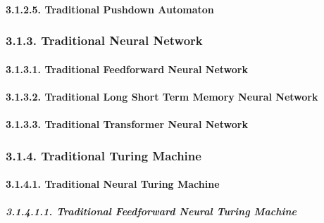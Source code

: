 \documentclass[
]{article}
\begin{document}
\hypertarget{traditional-pushdown-automaton-1}{%
\paragraph{3.1.2.5. Traditional Pushdown
Automaton}\label{traditional-pushdown-automaton-1}}

\hypertarget{traditional-neural-network-1}{%
\subsubsection{3.1.3. Traditional Neural
Network}\label{traditional-neural-network-1}}

\hypertarget{traditional-feedforward-neural-network-1}{%
\paragraph{3.1.3.1. Traditional Feedforward Neural
Network}\label{traditional-feedforward-neural-network-1}}

\hypertarget{traditional-long-short-term-memory-neural-network-1}{%
\paragraph{3.1.3.2. Traditional Long Short Term Memory Neural
Network}\label{traditional-long-short-term-memory-neural-network-1}}

\hypertarget{traditional-transformer-neural-network-1}{%
\paragraph{3.1.3.3. Traditional Transformer Neural
Network}\label{traditional-transformer-neural-network-1}}

\hypertarget{traditional-turing-machine-1}{%
\subsubsection{3.1.4. Traditional Turing
Machine}\label{traditional-turing-machine-1}}

\hypertarget{traditional-neural-turing-machine-1}{%
\paragraph{3.1.4.1. Traditional Neural Turing
Machine}\label{traditional-neural-turing-machine-1}}

\hypertarget{traditional-feedforward-neural-turing-machine-1}{%
\subparagraph{3.1.4.1.1. Traditional Feedforward Neural Turing
Machine}\label{traditional-feedforward-neural-turing-machine-1}}
\end{document}

